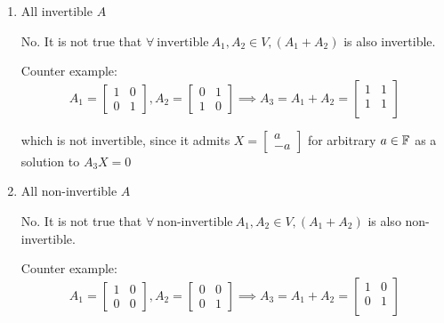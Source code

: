 \documentclass[a4paper, 11pt]{article}
\begin{document}
\begin{solution}
    \begin{enumerate}
        \item All invertible \(A\)

              No. It is not true that \(\forall \:\text{invertible}\: A_1, A_2 \in V, (A_1 + A_2)\) is also invertible.

              Counter example: \[
                  A_1 = \left[\begin{array}{cc}
                          1 & 0 \\
                          0 & 1
                      \end{array}\right], A_2 = \left[\begin{array}{cc}
                          0 & 1 \\
                          1 & 0
                      \end{array}\right] \implies A_3 = A_1 + A_2 = \left[\begin{array}{cc}
                          1 & 1 \\
                          1 & 1 \\
                      \end{array}\right]
              \]

              which is not invertible, since it admits \(X = \left[\begin{array}{c}
                      a \\ -a
                  \end{array}\right]\) for arbitrary \(a \in \mathbb{F}\) as a solution to \(A_3X = 0\)

        \item All non-invertible \(A\)

              No. It is not true that \(\forall \:\text{non-invertible}\: A_1, A_2 \in V, (A_1 + A_2)\) is also non-invertible.

              Counter example: \[
                  A_1 = \left[\begin{array}{cc}
                          1 & 0 \\
                          0 & 0
                      \end{array}\right], A_2 = \left[\begin{array}{cc}
                          0 & 0 \\
                          0 & 1
                      \end{array}\right] \implies A_3 = A_1 + A_2 = \left[\begin{array}{cc}
                          1 & 0 \\
                          0 & 1 \\
                      \end{array}\right]
              \]


\end{enumerate}
\end{solution}
\end{document}
